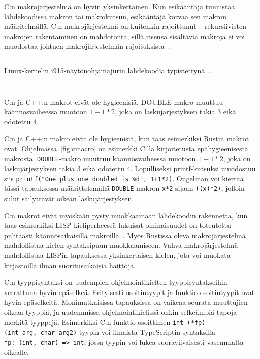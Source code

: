C:n makrojärjestelmä on hyvin yksinkertainen. Kun esikääntäjä tunnistaa
lähdekoodissa makron tai makrokutsun, esikääntäjä korvaa sen makron
määritelmällä. C:n makrojärjestelmä on kuitenkin rajoittunut -- rekursiivisten
makrojen rakentaminen on mahdotonta, sillä itsensä sisältäviä makroja ei voi
muodostaa johtuen makrojärjestelmän rajoituksista~\citep[luku 6.10.3.4]{C18}.

\FloatBarrier

\begin{listing}[ht!]
    \inputminted{C}{c-error-handling.c}
    \caption{Linux-kernelin i915-näytönohjainajurin lähdekoodia
    typistettynä~\citep[\texttt{drivers/gpu/drm/i915/i915\_perf.c}, funktio
    \texttt{i915\_oa\_stream\_init}]{i915debugfs}.}
    \label{fig:cerrorhandling}
\end{listing}

\FloatBarrier

\FloatBarrier

\begin{listing}[ht!]
    \inputminted{C}{c-hygiene.c}
    \inputminted{text}{c-hygiene-output.txt}
    \caption{C:n ja C++:n makrot eivät ole hygieenisiä. DOUBLE-makro muuttuu
    käännösvaiheessa muotoon $1+1*2$, joka on laskujärjestyksen takia 3 eikä
    odotettu 4.}
    \label{fig:cmacro}
\end{listing}

\FloatBarrier

C:n ja C++:n makro eivät ole hygieenisiä, kun taas esimerkiksi Rustin makrot
ovat. Ohjelmassa~\ref{fig:cmacro} on esimerkki C:llä kirjoitetusta
epähygieenisestä makrosta. \texttt{DOUBLE}-makro muuttuu käännösvaiheessa
muotoon $1+1*2$, joka on laskujärjestyksen takia 3 eikä odotettu 4.
Lopulliseksi printf-kutsuksi muodostuu siis \texttt{printf("One plus one
doubled is \%d", 1+1*2)}. Ongelman voi kiertää tässä tapauksessa
määrittelemällä \texttt{DOUBLE}-makron \texttt{x*2} sijaan \texttt{((x)*2)},
jolloin sulut säilyttävät oikean laskujärjestyksen.

C:n makrot eivät myöskään pysty muokkaamaan lähdekoodin rakennetta, kun taas
esimerkiksi LISP-kieliperheessä lukuisat ominaisuudet on toteutettu puhtaasti
käännösaikaisilla makroilla~\citep{lispexpressions}. Myös Rustissa oleva
makrojärjestelmä mahdollistaa kielen syntaksipuun muokkaamiseen. Vahva
makrojärjestelmä mahdollistaa LISPin tapauksessa yksinkertaisen kielen, jota
voi muokata kirjastoilla ilman suoritusaikaisia haittoja.

C:n tyyppisyntaksi on uudempien ohjelmointikielten tyyppisyntakseihin
verrattuna hyvin epäselkeä. Erityisesti osoitintyypit ja funktio-osoitintyypit
ovat hyvin epäselkeitä.
Monimutkaisissa tapauksissa on vaikeaa seurata muuttujien oikeaa tyyppiä, ja
uudemmissa ohjelmointikielissä onkin selkeämpiä tapoja merkitä tyyppejä.
Esimerkiksi C:n funktio-osoittimen \texttt{int~(*fp)(int~arg,~char~arg2)}
tyypin voi ilmaista TypeScriptin syntaksilla \texttt{fp:~(int,~char)~=>~int},
jossa tyypin voi lukea suoraviivaisesti vasemmalta oikealle.

